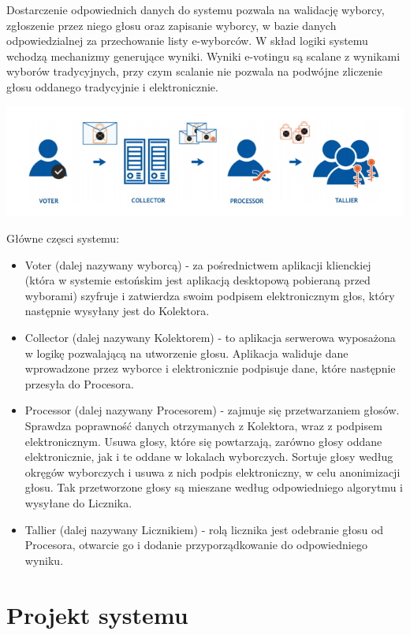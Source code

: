 \documentclass{report}
\begin{document}
Dostarczenie odpowiednich danych do systemu pozwala na walidację wyborcy, zgłoszenie przez 
niego głosu oraz zapisanie wyborcy, w bazie danych odpowiedzialnej za przechowanie listy e-wyborców. W skład logiki systemu wchodzą mechanizmy generujące wyniki. Wyniki e-votingu są scalane z wynikami wyborów tradycyjnych, przy czym scalanie nie pozwala na podwójne zliczenie głosu oddanego tradycyjnie i elektronicznie.


\includegraphics[width=\textwidth]{images/Główne częsci systemu estońskiego.png}

Główne częsci systemu:
\begin{itemize}
    \item Voter (dalej nazywany wyborcą) - za pośrednictwem aplikacji klienckiej (która w systemie estońskim jest aplikacją desktopową pobieraną przed wyborami) szyfruje i zatwierdza swoim podpisem elektronicznym głos, który następnie wysyłany jest do Kolektora.
    \item Collector (dalej nazywany Kolektorem) - to aplikacja serwerowa wyposażona w logikę pozwalającą na utworzenie głosu. Aplikacja waliduje dane wprowadzone przez wyborce i elektronicznie podpisuje dane, które następnie przesyła do Procesora.
    \item Processor (dalej nazywany Procesorem) - zajmuje się przetwarzaniem głosów. Sprawdza poprawność danych otrzymanych z Kolektora, wraz z podpisem elektronicznym. Usuwa głosy, które się powtarzają, zarówno głosy oddane elektronicznie, jak i te oddane w lokalach wyborczych. Sortuje głosy według okręgów wyborczych i usuwa z nich podpis elektroniczny, w celu anonimizacji głosu. Tak przetworzone głosy są mieszane według odpowiedniego algorytmu i wysyłane do Licznika.
    \item Tallier (dalej nazywany Licznikiem) - rolą licznika jest odebranie głosu od Procesora, otwarcie go i dodanie przyporządkowanie do odpowiedniego wyniku.
\end{itemize}
\chapter{Projekt systemu}
\end{document}

